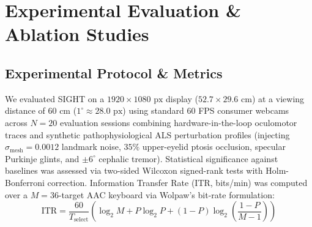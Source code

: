 \documentclass[twocolumn,10pt]{article}
\begin{document}
\section{Experimental Evaluation & Ablation Studies}
\label{sec:experiments}

\subsection{Experimental Protocol & Metrics}
We evaluated SIGHT on a $1920 \times 1080\text{ px}$ display ($52.7 \times 29.6\text{ cm}$) at a viewing distance of $60\text{ cm}$ ($1^\circ \approx 28.0\text{ px}$) using standard 60 FPS consumer webcams across $N = 20$ evaluation sessions combining hardware-in-the-loop oculomotor traces and synthetic pathophysiological ALS perturbation profiles (injecting $\sigma_{\text{mesh}} = 0.0012$ landmark noise, $35\%$ upper-eyelid ptosis occlusion, specular Purkinje glints, and $\pm 6^\circ$ cephalic tremor). Statistical significance against baselines was assessed via two-sided Wilcoxon signed-rank tests with Holm-Bonferroni correction. Information Transfer Rate (ITR, bits/min) was computed over a $M=36$-target AAC keyboard via Wolpaw's bit-rate formulation:
\begin{equation}
\text{ITR} = \frac{60}{T_{\text{select}}} \left(\log_2 M + P \log_2 P + (1 - P)\log_2\!\left(\frac{1 - P}{M - 1}\right)\right)
\end{equation}
\end{document}
